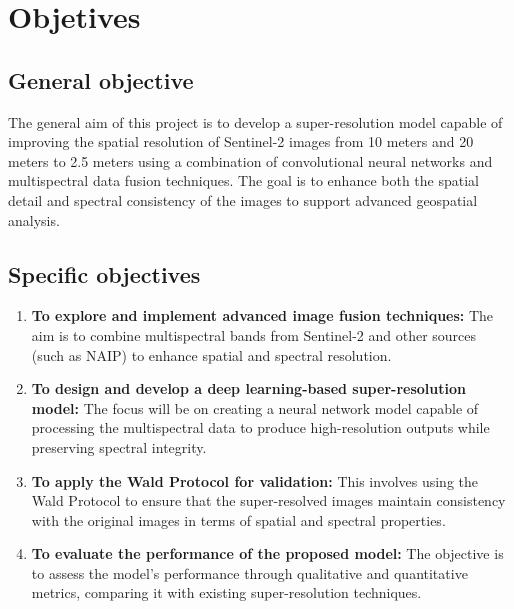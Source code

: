 \chapter{Objetives}
\section{General objective}

The general aim of this project is to develop a super-resolution model capable of improving the spatial resolution of Sentinel-2 images from 10 meters and 20 meters to 2.5 meters using a combination of convolutional neural networks and multispectral data fusion techniques. The goal is to enhance both the spatial detail and spectral consistency of the images to support advanced geospatial analysis.

\section{Specific objectives}

\begin{enumerate}
    \item \textbf{To explore and implement advanced image fusion techniques:} The aim is to combine multispectral bands from Sentinel-2 and other sources (such as NAIP) to enhance spatial and spectral resolution.
    \item \textbf{To design and develop a deep learning-based super-resolution model:} The focus will be on creating a neural network model capable of processing the multispectral data to produce high-resolution outputs while preserving spectral integrity.
    \item \textbf{To apply the Wald Protocol for validation:} This involves using the Wald Protocol to ensure that the super-resolved images maintain consistency with the original images in terms of spatial and spectral properties.
    \item \textbf{To evaluate the performance of the proposed model:} The objective is to assess the model's performance through qualitative and quantitative metrics, comparing it with existing super-resolution techniques.
\end{enumerate}